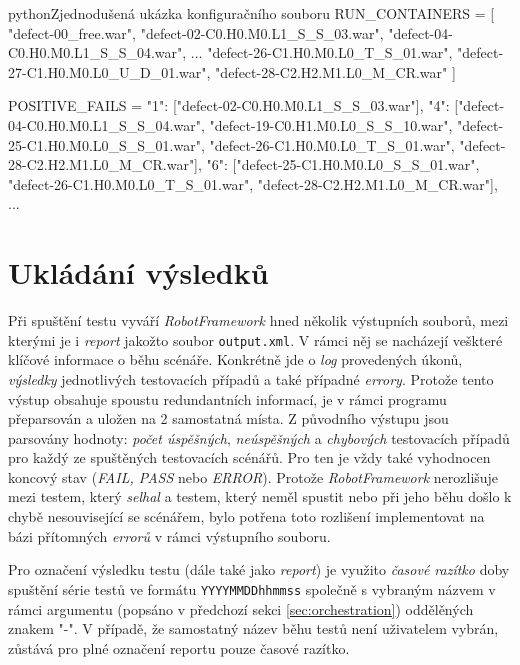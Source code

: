 \documentclass[czech, ma, kiv, he, iso690alph, pdf, viewonly]{fasthesis}
\begin{document}
    \begin{code}{python}{Zjednodušená ukázka konfiguračního souboru \label{lst:configuration}}
RUN_CONTAINERS = [
    "defect-00_free.war",
    "defect-02-C0.H0.M0.L1_S_S_03.war",
    "defect-04-C0.H0.M0.L1_S_S_04.war",
    ...
    "defect-26-C1.H0.M0.L0_T_S_01.war",
    "defect-27-C1.H0.M0.L0_U_D_01.war",
    "defect-28-C2.H2.M1.L0_M_CR.war"
]

POSITIVE_FAILS = {
    "1": ["defect-02-C0.H0.M0.L1_S_S_03.war"],
    "4": ["defect-04-C0.H0.M0.L1_S_S_04.war", "defect-19-C0.H1.M0.L0_S_S_10.war", "defect-25-C1.H0.M0.L0_S_S_01.war", "defect-26-C1.H0.M0.L0_T_S_01.war", "defect-28-C2.H2.M1.L0_M_CR.war"],
    "6": ["defect-25-C1.H0.M0.L0_S_S_01.war", "defect-26-C1.H0.M0.L0_T_S_01.war", "defect-28-C2.H2.M1.L0_M_CR.war"],
    ...
}
    \end{code}
    
    \section{Ukládání výsledků}
    Při spuštění testu vyváří \textit{RobotFramework} hned několik výstupních souborů, mezi kterými je i \textit{report} jakožto soubor \verb|output.xml|. V rámci něj se nacházejí veškteré klíčové informace o běhu scénáře. Konkrétně jde o \textit{log} provedených úkonů, \textit{výsledky} jednotlivých testovacích případů a také případné \textit{errory}. Protože tento výstup obsahuje spoustu redundantních informací, je v rámci programu přeparsován a uložen na 2 samostatná místa. Z původního výstupu jsou parsovány hodnoty: \textit{počet úspěšných}, \textit{neúspěšných} a \textit{chybových} testovacích případů pro každý ze spuštěných testovacích scénářů. Pro ten je vždy také vyhodnocen koncový stav (\textit{FAIL, PASS} nebo \textit{ERROR}). Protože \textit{RobotFramework} nerozlišuje mezi testem, který \emph{selhal} a testem, který neměl spustit nebo při jeho běhu došlo k chybě nesouvisející se scénářem, bylo potřena toto rozlišení implementovat na bázi přítomných \textit{errorů} v rámci výstupního souboru. 

    Pro označení výsledku testu (dále také jako \emph{report}) je využito \textit{časové razítko} doby spuštění série testů ve formátu \verb|YYYYMMDDhhmmss| společně s vybraným názvem v rámci argumentu (popsáno v předchozí sekci \ref{sec:orchestration}) oddělěných znakem "-". V případě, že samostatný název běhu testů není uživatelem vybrán, zůstává pro plné označení reportu pouze časové razítko.
\end{document}
